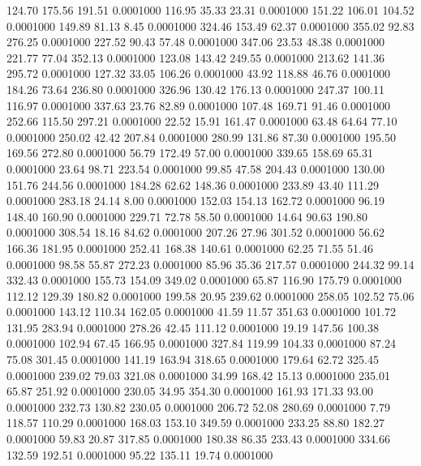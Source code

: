  124.70  175.56  191.51   0.0001000
 116.95   35.33   23.31   0.0001000
 151.22  106.01  104.52   0.0001000
 149.89   81.13    8.45   0.0001000
 324.46  153.49   62.37   0.0001000
 355.02   92.83  276.25   0.0001000
 227.52   90.43   57.48   0.0001000
 347.06   23.53   48.38   0.0001000
 221.77   77.04  352.13   0.0001000
 123.08  143.42  249.55   0.0001000
 213.62  141.36  295.72   0.0001000
 127.32   33.05  106.26   0.0001000
  43.92  118.88   46.76   0.0001000
 184.26   73.64  236.80   0.0001000
 326.96  130.42  176.13   0.0001000
 247.37  100.11  116.97   0.0001000
 337.63   23.76   82.89   0.0001000
 107.48  169.71   91.46   0.0001000
 252.66  115.50  297.21   0.0001000
  22.52   15.91  161.47   0.0001000
  63.48   64.64   77.10   0.0001000
 250.02   42.42  207.84   0.0001000
 280.99  131.86   87.30   0.0001000
 195.50  169.56  272.80   0.0001000
  56.79  172.49   57.00   0.0001000
 339.65  158.69   65.31   0.0001000
  23.64   98.71  223.54   0.0001000
  99.85   47.58  204.43   0.0001000
 130.00  151.76  244.56   0.0001000
 184.28   62.62  148.36   0.0001000
 233.89   43.40  111.29   0.0001000
 283.18   24.14    8.00   0.0001000
 152.03  154.13  162.72   0.0001000
  96.19  148.40  160.90   0.0001000
 229.71   72.78   58.50   0.0001000
  14.64   90.63  190.80   0.0001000
 308.54   18.16   84.62   0.0001000
 207.26   27.96  301.52   0.0001000
  56.62  166.36  181.95   0.0001000
 252.41  168.38  140.61   0.0001000
  62.25   71.55   51.46   0.0001000
  98.58   55.87  272.23   0.0001000
  85.96   35.36  217.57   0.0001000
 244.32   99.14  332.43   0.0001000
 155.73  154.09  349.02   0.0001000
  65.87  116.90  175.79   0.0001000
 112.12  129.39  180.82   0.0001000
 199.58   20.95  239.62   0.0001000
 258.05  102.52   75.06   0.0001000
 143.12  110.34  162.05   0.0001000
  41.59   11.57  351.63   0.0001000
 101.72  131.95  283.94   0.0001000
 278.26   42.45  111.12   0.0001000
  19.19  147.56  100.38   0.0001000
 102.94   67.45  166.95   0.0001000
 327.84  119.99  104.33   0.0001000
  87.24   75.08  301.45   0.0001000
 141.19  163.94  318.65   0.0001000
 179.64   62.72  325.45   0.0001000
 239.02   79.03  321.08   0.0001000
  34.99  168.42   15.13   0.0001000
 235.01   65.87  251.92   0.0001000
 230.05   34.95  354.30   0.0001000
 161.93  171.33   93.00   0.0001000
 232.73  130.82  230.05   0.0001000
 206.72   52.08  280.69   0.0001000
   7.79  118.57  110.29   0.0001000
 168.03  153.10  349.59   0.0001000
 233.25   88.80  182.27   0.0001000
  59.83   20.87  317.85   0.0001000
 180.38   86.35  233.43   0.0001000
 334.66  132.59  192.51   0.0001000
  95.22  135.11   19.74   0.0001000
